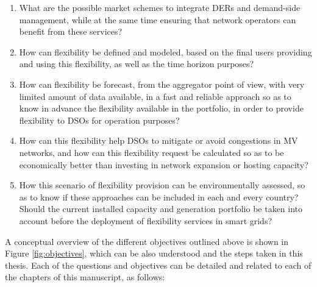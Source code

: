 \begin{tcolorbox}
\begin{enumerate}
\item What are the possible market schemes to integrate DERs and demand-side management, while at the same time ensuring that network operators can benefit from these services?  
\item How can flexibility be defined and modeled, based on the final users providing and using this flexibility, as well as the time horizon purposes? 
\item How can flexibility be forecast, from the aggregator point of view, with very limited amount of data available, in a fast and reliable approach so as to know in advance the flexibility available in the portfolio, in order to provide flexibility to DSOs for operation purposes?
\item How can this flexibility help DSOs to mitigate or avoid congestions in MV networks, and how can this flexibility request be calculated so as to be economically better than investing in network expansion or hosting capacity?
\item How this scenario of flexibility provision can be environmentally assessed, so as to know if these approaches can be included in each and every country? Should the current installed capacity and generation portfolio be taken into account before the deployment of flexibility services in smart grids?
\end{enumerate}
\end{tcolorbox}

A conceptual overview of the different objectives outlined above is shown in Figure \ref{fig:objectives}, which can be also understood and the steps taken in this thesis. Each of the questions and objectives can be detailed and related to each of the chapters of this manuscript, as follows: 

